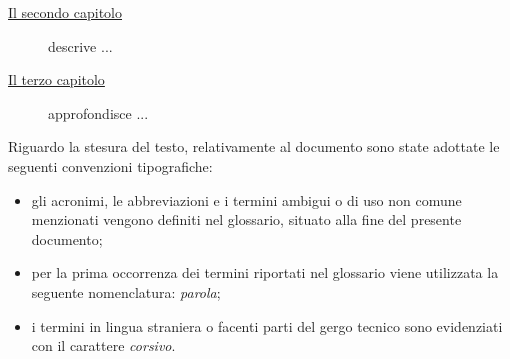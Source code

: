 \begin{description}
    \item[{\hyperref[cap:processi-metodologie]{Il secondo capitolo}}] descrive ...
    
    \item[{\hyperref[cap:descrizione-stage]{Il terzo capitolo}}] approfondisce ...
    
    
    
    
\end{description}

Riguardo la stesura del testo, relativamente al documento sono state adottate le seguenti convenzioni tipografiche:
\begin{itemize}
	\item gli acronimi, le abbreviazioni e i termini ambigui o di uso non comune menzionati vengono definiti nel glossario, situato alla fine del presente documento;
	\item per la prima occorrenza dei termini riportati nel glossario viene utilizzata la seguente nomenclatura: \emph{parola}\glsfirstoccur;
	\item i termini in lingua straniera o facenti parti del gergo tecnico sono evidenziati con il carattere \emph{corsivo}.
\end{itemize}